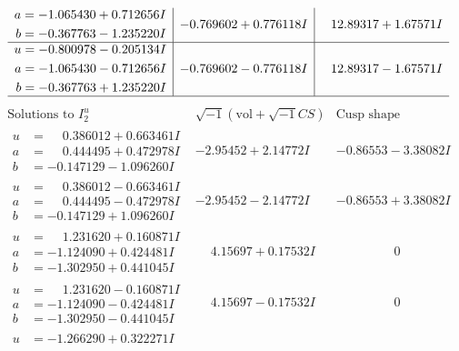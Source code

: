 \documentclass[1p]{elsarticle_modified}
\theoremstyle{definition}
\newcommand{\I}{\sqrt{-1}}
\begin{document}
$$\begin{array}{c|c|c}
\begin{aligned}
a &= -1.065430 + 0.712656 I \\
b &= -0.367763 - 1.235220 I\end{aligned}
 & -0.769602 + 0.776118 I & \phantom{-}12.89317 + 1.67571 I \\ \hline\begin{aligned}
u &= -0.800978 - 0.205134 I \\
a &= -1.065430 - 0.712656 I \\
b &= -0.367763 + 1.235220 I\end{aligned}
 & -0.769602 - 0.776118 I & \phantom{-}12.89317 - 1.67571 I\\
 \hline 
 \end{array}$$\newpage$$\begin{array}{c|c|c}  
\text{Solutions to }I^u_{2}& \I (\text{vol} + \sqrt{-1}CS) & \text{Cusp shape}\\
 \hline 
\begin{aligned}
u &= \phantom{-}0.386012 + 0.663461 I \\
a &= \phantom{-}0.444495 + 0.472978 I \\
b &= -0.147129 - 1.096260 I\end{aligned}
 & -2.95452 + 2.14772 I & -0.86553 - 3.38082 I \\ \hline\begin{aligned}
u &= \phantom{-}0.386012 - 0.663461 I \\
a &= \phantom{-}0.444495 - 0.472978 I \\
b &= -0.147129 + 1.096260 I\end{aligned}
 & -2.95452 - 2.14772 I & -0.86553 + 3.38082 I \\ \hline\begin{aligned}
u &= \phantom{-}1.231620 + 0.160871 I \\
a &= -1.124090 + 0.424481 I \\
b &= -1.302950 + 0.441045 I\end{aligned}
 & \phantom{-}4.15697 + 0.17532 I & \phantom{-0.000000 } 0 \\ \hline\begin{aligned}
u &= \phantom{-}1.231620 - 0.160871 I \\
a &= -1.124090 - 0.424481 I \\
b &= -1.302950 - 0.441045 I\end{aligned}
 & \phantom{-}4.15697 - 0.17532 I & \phantom{-0.000000 } 0 \\ \hline\begin{aligned}
u &= -1.266290 + 0.322271 I \\

\end{aligned}
\end{array}$$
\end{document}
